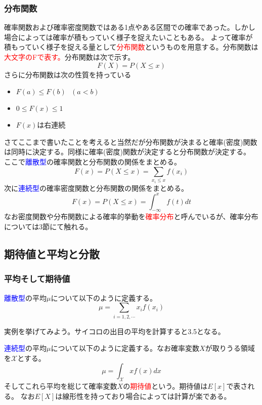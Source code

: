 \documentclass[a4paper,10pt]{jarticle}
\begin{document}
\subsubsection{分布関数}
確率関数および確率密度関数ではある1点やある区間での確率であった。しかし場合によっては確率が積もっていく様子を捉えたいこともある。
よって確率が積もっていく様子を捉える量として\textcolor{red}{分布関数}というものを用意する。分布関数は\textcolor{red}{大文字のFで表す。}分布関数は次で示す。
\begin{equation}
    F(X)=P(X\leq x)\tag{2,7}
\end{equation}
さらに分布関数は次の性質を持っている
\begin{itemize}
    \item $F(a)\leq F(b) \ \ \ (a<b)$
    \item $0\leq F(x) \leq 1$
    \item $F(x)$は右連続
\end{itemize}
さてここまで書いたことを考えると当然だが分布関数が決まると確率(密度)関数は同時に決定する。同様に確率(密度)関数が決定すると分布関数が決定する。
ここで\textcolor{blue}{離散型}の確率関数と分布関数の関係をまとめる。
\begin{equation}
    F(x) = P(X\leq x) =\sum_{x_i\leq x}f(x_i)\tag{2,8}
\end{equation}
次に\textcolor{blue}{連続型}の確率密度関数と分布関数の関係をまとめる。
\begin{equation}
    F(x) = P(X\leq x) = \int_{-\infty}^x f(t)dt\tag{2,9}
\end{equation}
なお密度関数や分布関数による確率的挙動を\textcolor{red}{確率分布}と呼んでいるが、確率分布については3節にて触れる。
\subsection{期待値と平均と分散}
\subsubsection{平均そして期待値}
\textcolor{blue}{離散型}の平均$\mu$について以下のように定義する。
\begin{equation}
    \mu = \sum_{i= 1,2,\cdots} x_if(x_i)\tag{2,10}
\end{equation}

実例を挙げてみよう。サイコロの出目の平均を計算すると3.5となる。

\textcolor{blue}{連続型}の平均$\mu$について以下のように定義する。なお確率変数$X$が取りうる領域を$\mathcal{X} $とする。
\begin{equation}
    \mu = \int_\mathcal{X}xf(x)dx\tag{2,11}
\end{equation}
そしてこれら平均を総じて確率変数$X$の\textcolor{red}{期待値}という。期待値は$E[x]$で表される。
なお$E[X]$は線形性を持っており場合によっては計算が楽である。
\end{document}
